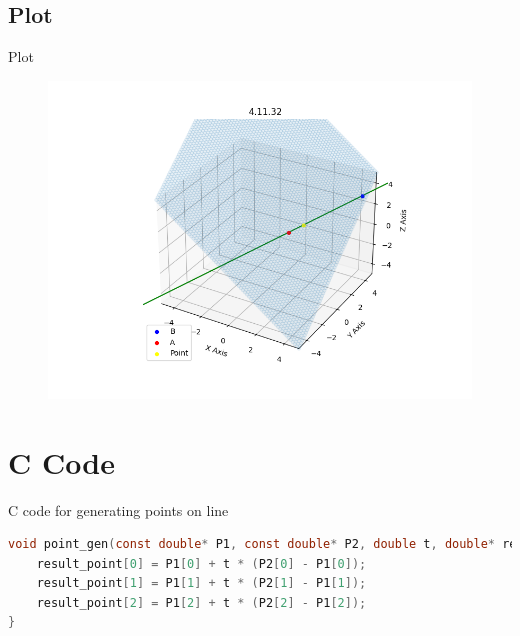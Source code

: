 \documentclass{beamer}
\theoremstyle{remark}
\numberwithin{equation}{section}
\begin{document}
\subsection{Plot}
\begin{frame}{Plot}
 \begin{figure}[H]
    \centering
    \includegraphics[width=0.8\columnwidth]{../figs/plot.png}
    \caption*{}
    \label{fig:plot}
\end{figure}
\end{frame}

\section{C Code}
\begin{frame}[fragile]{C code for generating points on line}
\begin{lstlisting}[language=C]
 void point_gen(const double* P1, const double* P2, double t, double* result_point) {
    result_point[0] = P1[0] + t * (P2[0] - P1[0]);
    result_point[1] = P1[1] + t * (P2[1] - P1[1]);
    result_point[2] = P1[2] + t * (P2[2] - P1[2]);
}
\end{lstlisting}
\end{frame}
\end{document}
